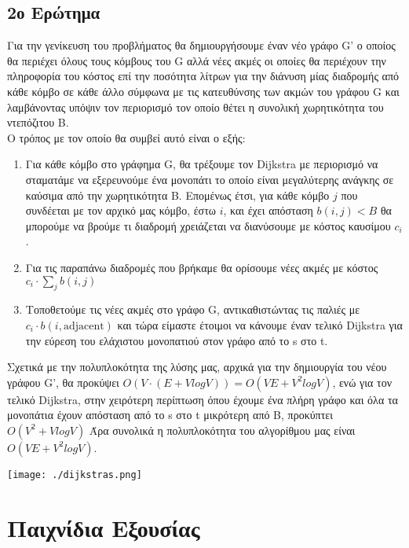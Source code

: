 \documentclass{article}
\begin{document}
\subsection{2ο Ερώτημα}
Για την γενίκευση του προβλήματος θα δημιουργήσουμε έναν νέο γράφο G' ο οποίος θα περιέχει όλους τους 
κόμβους του G αλλά νέες ακμές οι οποίες θα περιέχουν την πληροφορία του κόστος επί την ποσότητα λίτρων 
για την διάνυση μίας διαδρομής από κάθε κόμβο σε κάθε άλλο σύμφωνα με τις κατευθύνσης των ακμών του γράφου 
G και λαμβάνοντας υπόψιν τον περιορισμό τον οποίο θέτει η συνολική χωρητικότητα του ντεπόζιτου B.\\

Ο τρόπος με τον οποίο θα συμβεί αυτό είναι ο εξής:
\begin{enumerate}
    \item{Για κάθε κόμβο στο γράφημα G, θα τρέξουμε τον Dijkstra με περιορισμό να σταματάμε να εξερευνούμε
        ένα μονοπάτι το οποίο είναι μεγαλύτερης ανάγκης σε καύσιμα από την χωρητικότητα B. Επομένως έτσι, 
        για κάθε κόμβο $j$ που συνδέεται με τον αρχικό μας κόμβο, έστω $i$, και έχει απόσταση $b(i,j) < B$
        θα μπορούμε να βρούμε τι διαδρομή  χρειάζεται να διανύσουμε με κόστος καυσίμου $c_i$.} 
    \item{Για τις παραπάνω διαδρομές που βρήκαμε θα ορίσουμε νέες ακμές με κόστος $c_i\cdot \sum_{j}b(i,j)$}
    \item{Τοποθετούμε τις νέες ακμές στο γράφο G, αντικαθιστώντας τις παλιές με $c_i\cdot b(i,\text{adjacent})$
        και τώρα είμαστε έτοιμοι να κάνουμε έναν τελικό Dijkstra για την εύρεση του ελάχιστου μονοπατιού στον γράφο από
        το s στο t.}
\end{enumerate}

Σχετικά με την πολυπλοκότητα της λύσης μας, αρχικά για την δημιουργία του νέου γράφου G', θα προκύψει
$O(V\cdot (E + VlogV)) = O(VE + V^2logV)$, ενώ για τον τελικό Dijkstra, στην χειρότερη περίπτωση όπου 
έχουμε ένα πλήρη γράφο και όλα τα μονοπάτια έχουν απόσταση από το s στο t μικρότερη από B, προκύπτει
$O(V^2 + VlogV)$ Άρα συνολικά η πολυπλοκότητα του αλγορίθμου μας είναι $O(VE + V^2logV)$.



\begin{center}
    \texttt{[image: ./dijkstras.png]}
\end{center}

\pagebreak
\section{Παιχνίδια Εξουσίας}
\end{document}
